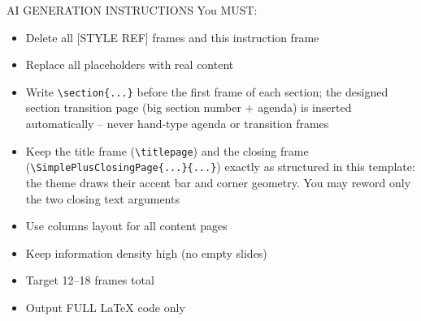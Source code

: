 \documentclass[aspectratio=169,10pt,t,xcolor=table]{beamer}
\begin{document}
\begin{frame}[allowframebreaks]{AI GENERATION INSTRUCTIONS}
You MUST:
\begin{itemize}
\item Delete all [STYLE REF] frames and this instruction frame
\item Replace all placeholders with real content
\item Write \texttt{\textbackslash section\{...\}} before the first frame of each
      section; the designed section transition page (big section number + agenda)
      is inserted automatically -- never hand-type agenda or transition frames
\item Keep the title frame (\texttt{\textbackslash titlepage}) and the closing
      frame (\texttt{\textbackslash SimplePlusClosingPage\{...\}\{...\}}) exactly
      as structured in this template: the theme draws their accent bar and corner
      geometry. You may reword only the two closing text arguments
\item Use columns layout for all content pages
\item Keep information density high (no empty slides)
\item Target 12--18 frames total
\item Output FULL LaTeX code only
\end{itemize}
\end{frame}

\begin{frame}[plain,c]
\end{frame}
\end{document}
